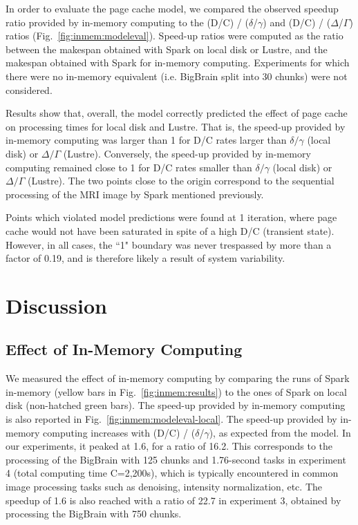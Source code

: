 In order to evaluate the page cache model, we compared the observed speedup
ratio provided by in-memory computing to the (D/C) / ($\delta$/$\gamma$) and
(D/C) / ($\Delta$/$\Gamma$) ratios (Fig.~\ref{fig:inmem:modeleval}). Speed-up ratios
were computed as the ratio between the makespan obtained with Spark on local
disk or Lustre, and the makespan obtained with Spark for in-memory computing.
Experiments for which there were no in-memory equivalent (i.e. BigBrain split
into 30 chunks) were not considered.

Results show that, overall, the model correctly predicted the effect of page
cache on processing times for local disk and Lustre. That is, the speed-up
provided by in-memory computing was larger than 1 for D/C rates larger than
$\delta/\gamma$ (local disk) or $\Delta/\Gamma$ (Lustre). Conversely, the
speed-up provided by in-memory computing remained close to 1 for D/C rates
smaller than $\delta/\gamma$ (local disk) or $\Delta/\Gamma$ (Lustre). The two
points close to the origin correspond to the sequential processing of the MRI
image by Spark mentioned previously.

Points which violated model predictions were found at 1 iteration, where page
cache would not have been saturated in spite of a high D/C (transient state).
However, in all cases, the ``1" boundary was never trespassed by more than a
factor of 0.19, and is therefore likely a result of system variability.

\section{Discussion} %
\label{sec:inmem:discussion}

\subsection{Effect of In-Memory Computing}
We measured the effect of in-memory computing by comparing the runs of Spark
in-memory (yellow bars in Fig.~\ref{fig:inmem:results}) to the ones of Spark on local
disk (non-hatched green bars). The speed-up provided by in-memory computing is
also reported in Fig.~\ref{fig:inmem:modeleval-local}. The speed-up provided by
in-memory computing increases with (D/C) / ($\delta$/$\gamma$), as expected from
the model. In our experiments, it peaked at 1.6, for a ratio of 16.2. This
corresponds to the processing of the BigBrain with 125 chunks and 1.76-second
tasks in experiment 4 (total computing time C=2,200s), which is typically
encountered in common image processing tasks such as denoising, intensity
normalization, etc. The speedup of 1.6 is also reached with a ratio of 22.7 in
experiment 3, obtained by processing the BigBrain with 750 chunks.

